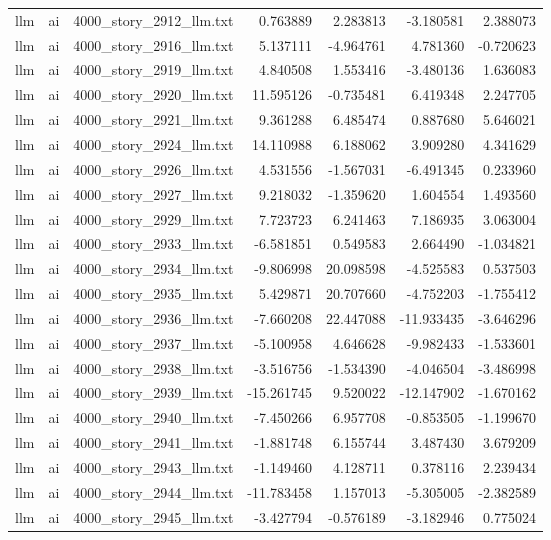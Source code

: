 \begin{longtable}{lllrrrr}
llm & ai & 4000\_story\_2912\_llm.txt & 0.763889 & 2.283813 & -3.180581 & 2.388073 \\
llm & ai & 4000\_story\_2916\_llm.txt & 5.137111 & -4.964761 & 4.781360 & -0.720623 \\
llm & ai & 4000\_story\_2919\_llm.txt & 4.840508 & 1.553416 & -3.480136 & 1.636083 \\
llm & ai & 4000\_story\_2920\_llm.txt & 11.595126 & -0.735481 & 6.419348 & 2.247705 \\
llm & ai & 4000\_story\_2921\_llm.txt & 9.361288 & 6.485474 & 0.887680 & 5.646021 \\
llm & ai & 4000\_story\_2924\_llm.txt & 14.110988 & 6.188062 & 3.909280 & 4.341629 \\
llm & ai & 4000\_story\_2926\_llm.txt & 4.531556 & -1.567031 & -6.491345 & 0.233960 \\
llm & ai & 4000\_story\_2927\_llm.txt & 9.218032 & -1.359620 & 1.604554 & 1.493560 \\
llm & ai & 4000\_story\_2929\_llm.txt & 7.723723 & 6.241463 & 7.186935 & 3.063004 \\
llm & ai & 4000\_story\_2933\_llm.txt & -6.581851 & 0.549583 & 2.664490 & -1.034821 \\
llm & ai & 4000\_story\_2934\_llm.txt & -9.806998 & 20.098598 & -4.525583 & 0.537503 \\
llm & ai & 4000\_story\_2935\_llm.txt & 5.429871 & 20.707660 & -4.752203 & -1.755412 \\
llm & ai & 4000\_story\_2936\_llm.txt & -7.660208 & 22.447088 & -11.933435 & -3.646296 \\
llm & ai & 4000\_story\_2937\_llm.txt & -5.100958 & 4.646628 & -9.982433 & -1.533601 \\
llm & ai & 4000\_story\_2938\_llm.txt & -3.516756 & -1.534390 & -4.046504 & -3.486998 \\
llm & ai & 4000\_story\_2939\_llm.txt & -15.261745 & 9.520022 & -12.147902 & -1.670162 \\
llm & ai & 4000\_story\_2940\_llm.txt & -7.450266 & 6.957708 & -0.853505 & -1.199670 \\
llm & ai & 4000\_story\_2941\_llm.txt & -1.881748 & 6.155744 & 3.487430 & 3.679209 \\
llm & ai & 4000\_story\_2943\_llm.txt & -1.149460 & 4.128711 & 0.378116 & 2.239434 \\
llm & ai & 4000\_story\_2944\_llm.txt & -11.783458 & 1.157013 & -5.305005 & -2.382589 \\
llm & ai & 4000\_story\_2945\_llm.txt & -3.427794 & -0.576189 & -3.182946 & 0.775024 \\

\end{longtable}
